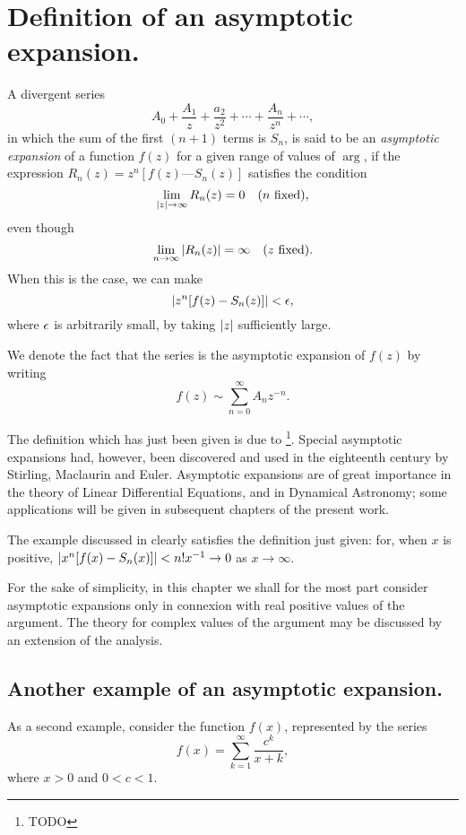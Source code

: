 \section{Definition of an asymptotic expansion.}
A divergent series
$$
A_{0}
+ \frac{A_{1}}{z}
+ \frac{a_{2}}{z^{2}}
+ \cdots
+ \frac{A_{n}}{z^{n}}
+ \cdots,
$$
in which the sum of the first $(n + 1)$ terms is $S_{n}$, is said to
be an \emph{asymptotic expansion} of a function $f(z)$ for a given
range of values of $\arg$, if the expression
$R_{n}(z) = z^{n}[f(z) — S_{n}(z)]$
satisfies the condition 
$$
\lim_{ \left| z \right| \rightarrow \infty } R_{n}(z) = 0
\quad
(\textrm{$n$ fixed}),
$$
even though
$$
\lim_{n \rightarrow \infty}
\left| R_{n}(z) \right| = \infty
\quad
(\textrm{$z$ fixed}).
$$
When this is the case, we can make
$$
\left| 
  z^{n}
  [f(z) - S_{n}(z)]
 \right|
<
\epsilon,
$$
where $\epsilon$ is arbitrarily small, by taking $\left| z \right|$ sufficiently
large.

We denote the fact that the series is the asymptotic expansion of
$f(z)$ by writing
$$
f(z)
\sim
\sum_{n=0}^{\infty} A_{n} z^{-n}.
$$

The definition which has just been given is due to
\Poincare\footnote{TODO}. Special asymptotic expansions had, however,
been discovered and used in the eighteenth century by Stirling,
Maclaurin and Euler. Asymptotic expansions are of great importance in
the theory of Linear Differential Equations, and in Dynamical
Astronomy; some applications will be given in subsequent chapters of
the present work. 

The example discussed in  clearly satisfies the definition just
given: for, when $x$ is positive,
$\left| x^{n} [f(x) - S_{n}(x)] \right| < n! x^{-1} \rightarrow 0$ as
$x \rightarrow \infty$.

For the sake of simplicity, in this chapter we shall for the most part
consider asymptotic expansions only in connexion with real positive
values of the argument. The theory for complex values of the argument
may be discussed by an extension of the analysis.

\subsection{Another example of an asymptotic expansion.}
As a second example, consider the function $f(x)$, represented by the
series 
$$
f(x)
=
\sum_{k=1}^{\infty} \frac{c^{k}}{x+k},
$$
where $x > 0$ and $0 < c < 1$.


